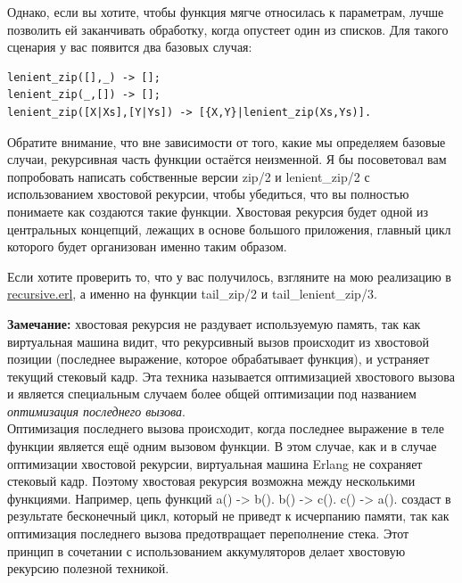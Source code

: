\documentclass[a4paper,12pt]{report}
\newcommand{\ops}{\colorbox{lgreen}}
\begin{document}
Однако, если вы хотите, чтобы функция мягче относилась к параметрам, лучше позволить ей заканчивать обработку, когда опустеет один из списков. Для такого сценария у вас появится два базовых случая:
\begin{lstlisting}[style=erlang]
lenient_zip([],_) -> [];
lenient_zip(_,[]) -> [];
lenient_zip([X|Xs],[Y|Ys]) -> [{X,Y}|lenient_zip(Xs,Ys)].
\end{lstlisting}

Обратите внимание, что вне зависимости от того, какие мы определяем базовые случаи, рекурсивная часть функции остаётся неизменной. Я бы посоветовал вам попробовать написать собственные версии \ops{zip/2} и \ops{lenient\_zip/2} с использованием хвостовой рекурсии, чтобы убедиться, что вы полностью понимаете как создаются такие функции. Хвостовая рекурсия будет одной из центральных концепций, лежащих в основе большого приложения, главный цикл которого будет организован именно таким образом.

Если хотите проверить то, что у вас получилось, взгляните на мою реализацию в \href{http://learnyousomeerlang.com/static/erlang/recursive.erl}{recursive.erl}, а именно на функции \ops{tail\_zip/2} и \ops{tail\_lenient\_zip/3}.
\colorbox{lgray}
{
    \begin{minipage}{\linewidth}
\textbf{Замечание:} хвостовая рекурсия не раздувает используемую память, так как виртуальная машина видит, что рекурсивный вызов происходит из хвостовой позиции (последнее выражение, которое обрабатывает функция), и устраняет текущий стековый кадр. Эта техника называется оптимизацией хвостового вызова и является специальным случаем более общей оптимизации под названием \emph{оптимизация последнего вызова}.\\
Оптимизация последнего вызова происходит, когда последнее выражение в теле функции является ещё одним вызовом функции. В этом случае, как и в случае оптимизации хвостовой рекурсии, виртуальная машина Erlang не сохраняет стековый кадр. Поэтому хвостовая рекурсия возможна между несколькими функциями. Например, цепь функций \ops{a() -> b(). b() -> c(). c() -> a().} создаст в результате бесконечный цикл, который не приведт к исчерпанию памяти, так как оптимизация последнего вызова предотвращает переполнение стека. Этот принцип в сочетании с использованием аккумуляторов делает хвостовую рекурсию полезной техникой.
    \end{minipage}
}
\end{document}
